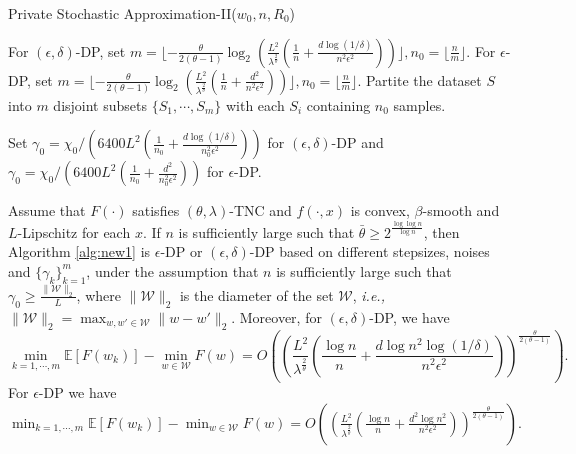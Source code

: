 \documentclass[12pt]{alt2022} %
\begin{document}
		\begin{algorithm}
	\caption{Private Stochastic Approximation-II($w_0,n,R_0$) \label{alg:new1}}
	   For $(\epsilon, \delta)$-DP, set $ m=\lfloor -\frac{\theta}{2(\theta-1)}\log_2 (\frac{L^2}{\lambda^\frac{2}{\theta}}(\frac{1}{n}+\frac{d\log(1/\delta)}{n^2\epsilon^2}))   \rfloor, n_0=\lfloor\frac{n}{m}\rfloor$. For $\epsilon$-DP, set $ m=\lfloor -\frac{\theta}{2(\theta-1)}\log_2 (\frac{L^2}{\lambda^\frac{2}{\theta}}(\frac{1}{n}+\frac{d^2}{n^2\epsilon^2}))   \rfloor, n_0=\lfloor\frac{n}{m}\rfloor$. Partite the dataset $S$ into $m$ disjoint subsets $\{S_1, \cdots, S_m\}$ with each $S_i$ containing $n_0$ samples. \;
	   
	   Set $
	    {\gamma_0}= \chi_0 / ({6400 L^2}(\frac{1}{n_0}+\frac{d\log(1/\delta)}{n_0^2\epsilon^2}))$ for $(\epsilon, \delta)$-DP and  $\gamma_0 = \chi_0/ ({6400 L^2}(\frac{1}{n_0}+\frac{d^2}{n_0^2\epsilon^2}))$ for $\epsilon$-DP. \;
	    
\end{algorithm}
	\begin{theorem}\label{new:th1}
Assume that $F(\cdot)$ satisfies $(\theta, \lambda)$-TNC and $f(\cdot, x)$ is  convex, $\beta$-smooth and $L$-Lipschitz for each $x$. If $n$ is sufficiently large such that $\bar{\theta}\geq 2^{\frac{\log\log n}{\log n}}$, then Algorithm \ref{alg:new1} is $\epsilon$-DP or $(\epsilon,\delta)$-DP based on different stepsizes, noises and $\{\gamma_k\}_{k=1}^m$, under the assumption that $n$ is sufficiently large such that $\gamma_0 \geq \frac{\|\mathcal{W}\|_2}{L}$, where $\|\mathcal{W}\|_2$ is the diameter of the set $\mathcal{W}$, {\em i.e.,} $\|\mathcal{W}\|_2=\max_{w, w'\in \mathcal{W}}\|w-w'\|_2$. Moreover, for $(\epsilon, \delta)$-DP, we have 
\begin{equation*}
    \min_{k=1, \cdots, m} \mathbb{E}[F(w_k)]-\min_{w\in \mathcal{W}}F(w)=O\left( \left (\frac{ L^2}{\lambda^\frac{2}{\theta}} \left(\frac{\log n}{n}+\frac{d\log n^2\log(1/\delta)}{n^2\epsilon^2}\right)\right)^\frac{\theta}{2(\theta-1)}\right).  
\end{equation*}
For $\epsilon$-DP we have 
    $\min_{k=1, \cdots, m} \mathbb{E}[F(w_k)]-\min_{w\in \mathcal{W}}F(w)=O\left(  \left(\frac{ L^2}{\lambda^\frac{2}{\theta}}\left (\frac{\log n}{n}+\frac{d^2\log n^2}{n^2\epsilon^2}\right)\right)^\frac{\theta}{2(\theta-1)}\right).  $
\end{theorem}
\end{document}
